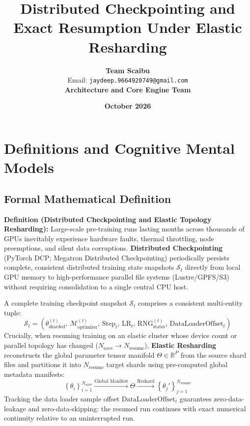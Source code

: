 \documentclass[11pt,a4paper]{article}
\title{\textbf{Distributed Checkpointing and Exact Resumption Under Elastic Resharding}}
\author{\textbf{Team Scaibu} \\ \small Email: \texttt{jaydeep.9664920749@gmail.com} \\ \small \textbf{Architecture and Core Engine Team}}
\date{\textbf{October 2026}}
\theoremstyle{definition}
\begin{document}
\maketitle

\section{Definitions and Cognitive Mental Models}

\subsection{Formal Mathematical Definition}
\textbf{Definition (Distributed Checkpointing and Elastic Topology Resharding):}
Large-scale pre-training runs lasting months across thousands of GPUs inevitably experience hardware faults, thermal throttling, node preemptions, and silent data corruptions. \textbf{Distributed Checkpointing} (PyTorch DCP; Megatron Distributed Checkpointing) periodically persists complete, consistent distributed training state snapshots $\mathcal{S}_t$ directly from local GPU memory to high-performance parallel file systems (Lustre/GPFS/S3) without requiring consolidation to a single central CPU host.

A complete training checkpoint snapshot $\mathcal{S}_t$ comprises a consistent multi-entity tuple:
{\boldmath
\begin{equation}
\mathcal{S}_t = \left( \theta_{\text{sharded}}^{(t)}, \, \mathcal{M}_{\text{optimizer}}^{(t)}, \, \text{Step}_t, \, \text{LR}_t, \, \text{RNG}_{\text{states}}^{(t)}, \, \text{DataLoaderOffset}_t \right)
\end{equation}
}
Crucially, when resuming training on an elastic cluster whose device count or parallel topology has changed ($N_{\text{save}} \to N_{\text{resume}}$), \textbf{Elastic Resharding} reconstructs the global parameter tensor manifold $\Theta \in \mathbb{R}^P$ from the source shard files and partitions it into $N_{\text{resume}}$ target shards using pre-computed global metadata manifests:
{\boldmath
\begin{equation}
\left\{ \theta_i \right\}_{i=1}^{N_{\text{save}}} \xrightarrow{\text{Global Manifest}} \Theta \xrightarrow{\text{Reshard}} \left\{ \theta_j' \right\}_{j=1}^{N_{\text{resume}}}
\end{equation}
}
Tracking the data loader sample offset $\text{DataLoaderOffset}_t$ guarantees zero-data-leakage and zero-data-skipping: the resumed run continues with exact numerical continuity relative to an uninterrupted run.
\end{document}
